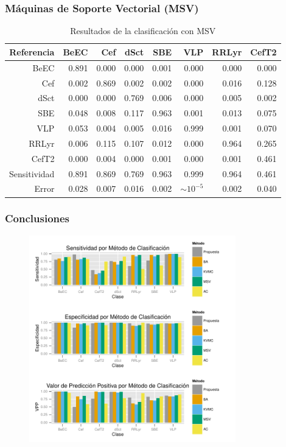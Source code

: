 \documentclass{beamer}
\begin{document}
\begin{frame}
\frametitle{Máquinas de Soporte Vectorial (MSV)}
  \begin{table}[ht]
    \centering
    \resizebox{0.7\textwidth}{!} {
      \begin{tabular}{rrrrrrrr}
        \hline
        Referencia & BeEC & Cef & dSct & SBE & VLP & RRLyr & CefT2 \\ 
        \hline
        BeEC & 0.891 & 0.000 & 0.000 & 0.001 & 0.000 & 0.000 & 0.000 \\ 
        Cef & 0.002 & 0.869 & 0.002 & 0.002 & 0.000 & 0.016 & 0.128 \\ 
        dSct & 0.000 & 0.000 & 0.769 & 0.006 & 0.000 & 0.005 & 0.002 \\ 
        SBE & 0.048 & 0.008 & 0.117 & 0.963 & 0.001 & 0.013 & 0.075 \\ 
        VLP & 0.053 & 0.004 & 0.005 & 0.016 & 0.999 & 0.001 & 0.070 \\ 
        RRLyr & 0.006 & 0.115 & 0.107 & 0.012 & 0.000 & 0.964 & 0.265 \\ 
        CefT2 & 0.000 & 0.004 & 0.000 & 0.001 & 0.000 & 0.001 & 0.461 \\
        \hline
        \hline
        Sensitividad &  0.891 & 0.869 & 0.769 & 0.963 & 0.999 & 0.964 & 0.461 \\ 
        \hline
        Error & 0.028 & 0.007 & 0.016 & 0.002 & $\sim 10^{-5}$ & 0.002 & 0.040 \\ 
        \hline
        \hline
      \end{tabular}
    }
    \caption{Resultados de la clasificación con MSV}
  \end{table}
\end{frame}

\begin{frame}
\frametitle{Conclusiones}
  \begin{figure}
    \centering
    \includegraphics[width=0.8\textwidth]{./img/resumen.pdf}
    \caption{}
    \label{fig:gull}
  \end{figure}
\end{frame}
\end{document}
